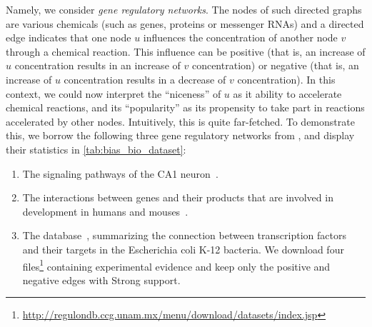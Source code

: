 Namely, we consider \emph{gene regulatory networks}. The nodes of such directed graphs are various
chemicals (such as genes, proteins or messenger RNAs) and a directed edge \euv{} indicates that one
node $u$ influences the concentration of another node $v$ through a chemical reaction. This
influence can be positive (that is, an increase of $u$ concentration results in an increase of $v$
concentration) or negative (that is, an increase of $u$ concentration results in a decrease of $v$
concentration). In this context, we could now interpret the \enquote{niceness} of $u$ as it ability
to accelerate chemical reactions, and its \enquote{popularity} as its propensity to take part in
reactions accelerated by other nodes. Intuitively, this is quite far-fetched. To demonstrate this,
we borrow the following three gene regulatory networks from \autocite[Table 1]{BioSigned09}, and
display their statistics in \autoref{tab:bias_bio_dataset}:
\begin{enumerate}[1.]
  \item The signaling pathways of the \hip{} CA1 neuron~\autocite{Hippocamp05}.
  \item The interactions between genes and their products that are involved in \can{} development in
    humans and mouses~\autocite{Cancer07}.
  \item The \reg{} database~\autocite{RegulonDB16}, summarizing the connection between transcription
    factors and their targets in the Escherichia coli K-12 bacteria. We download four
    files\footnote{\url{http://regulondb.ccg.unam.mx/menu/download/datasets/index.jsp}} containing
    experimental evidence and keep only the positive and negative edges with \textsf{Strong}
    support.
\end{enumerate}

